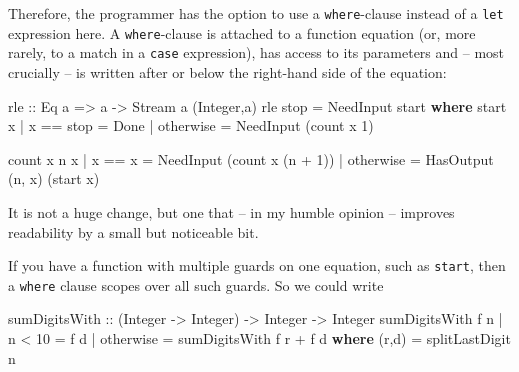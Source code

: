 \documentclass[11pt,
  american,
  DIV13]{article}
\newenvironment{Shaded}{}{}
\newcommand{\DataTypeTok}[1]{\textcolor[rgb]{0.56,0.13,0.00}{#1}}
\newcommand{\DecValTok}[1]{\textcolor[rgb]{0.25,0.63,0.44}{#1}}
\newcommand{\FunctionTok}[1]{\textcolor[rgb]{0.02,0.16,0.49}{#1}}
\newcommand{\KeywordTok}[1]{\textcolor[rgb]{0.00,0.44,0.13}{\textbf{#1}}}
\newcommand{\NormalTok}[1]{#1}
\newcommand{\OperatorTok}[1]{\textcolor[rgb]{0.40,0.40,0.40}{#1}}
\newcommand{\OtherTok}[1]{\textcolor[rgb]{0.00,0.44,0.13}{#1}}
\begin{document}
Therefore, the programmer has the option to use a \texttt{where}-clause
instead of a \texttt{let} expression here. A \texttt{where}-clause is
attached to a function equation (or, more rarely, to a match in a
\texttt{case} expression), has access to its parameters and -- most
crucially -- is written after or below the right-hand side of the
equation:

\begin{Shaded}
\begin{Highlighting}[]
\OtherTok{rle ::} \DataTypeTok{Eq}\NormalTok{ a }\OtherTok{=\textgreater{}}\NormalTok{ a }\OtherTok{{-}\textgreater{}} \DataTypeTok{Stream}\NormalTok{ a (}\DataTypeTok{Integer}\NormalTok{,a)}
\NormalTok{rle stop }\OtherTok{=} \DataTypeTok{NeedInput}\NormalTok{ start}
  \KeywordTok{where}
\NormalTok{    start x }\OperatorTok{|}\NormalTok{ x }\OperatorTok{==}\NormalTok{ stop }\OtherTok{=} \DataTypeTok{Done}
            \OperatorTok{|} \FunctionTok{otherwise} \OtherTok{=} \DataTypeTok{NeedInput}\NormalTok{ (count x }\DecValTok{1}\NormalTok{)}

\NormalTok{    count x n x\textquotesingle{} }\OperatorTok{|}\NormalTok{ x }\OperatorTok{==}\NormalTok{ x\textquotesingle{} }\OtherTok{=} \DataTypeTok{NeedInput}\NormalTok{ (count x (n }\OperatorTok{+} \DecValTok{1}\NormalTok{))}
                 \OperatorTok{|} \FunctionTok{otherwise} \OtherTok{=} \DataTypeTok{HasOutput}\NormalTok{ (n, x) (start x\textquotesingle{})}
\end{Highlighting}
\end{Shaded}

It is not a huge change, but one that -- in my humble opinion --
improves readability by a small but noticeable bit.

If you have a function with multiple guards on one equation, such as
\texttt{start}, then a \texttt{where} clause scopes over all such
guards. So we could write

\begin{Shaded}
\begin{Highlighting}[]
\OtherTok{sumDigitsWith ::}\NormalTok{ (}\DataTypeTok{Integer} \OtherTok{{-}\textgreater{}} \DataTypeTok{Integer}\NormalTok{) }\OtherTok{{-}\textgreater{}} \DataTypeTok{Integer} \OtherTok{{-}\textgreater{}} \DataTypeTok{Integer}
\NormalTok{sumDigitsWith f n}
  \OperatorTok{|}\NormalTok{ n }\OperatorTok{\textless{}} \DecValTok{10} \OtherTok{=}\NormalTok{ f d}
  \OperatorTok{|} \FunctionTok{otherwise} \OtherTok{=}\NormalTok{ sumDigitsWith f r }\OperatorTok{+}\NormalTok{ f d}
  \KeywordTok{where}\NormalTok{ (r,d) }\OtherTok{=}\NormalTok{ splitLastDigit n}
\end{Highlighting}
\end{Shaded}
\end{document}

